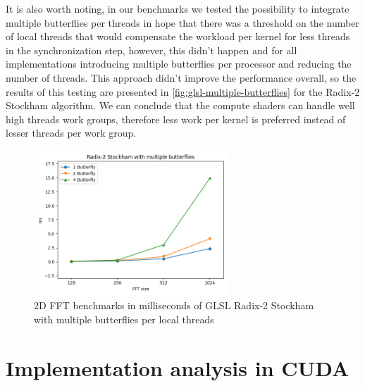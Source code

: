 \documentclass[
  oneside,
  11pt, a4paper,
  footinclude=true,
  headinclude=true,
  cleardoublepage=empty
]{scrbook}
\begin{document}
It is also worth noting, in our benchmarks we tested the possibility to integrate multiple butterflies per threads in hope that there was a threshold on the number of local threads that would compensate the workload per kernel for less threads in the synchronization step, however, this didn't happen and for all implementations introducing multiple butterflies per processor and reducing the number of threads. This approach didn't improve the performance overall, so the results of this testing are presented in \autoref{fig:glsl-multiple-butterflies} for the Radix-2 Stockham algorithm. We can conclude that the compute shaders can handle well high threads work groups, therefore less work per kernel is preferred instead of lesser threads per work group.

\begin{figure}[H] 
    \centering
    \includegraphics[width=0.65\textwidth]{img/results/glsl_multiple_butterflies.png}
    \caption{2D FFT benchmarks in milliseconds of GLSL Radix-2 Stockham with multiple butterflies per local threads}
    \label{fig:glsl-multiple-butterflies}
\end{figure}

\section{Implementation analysis in CUDA} \label{sec:implementation-analysis-in-cuda}
\end{document}
